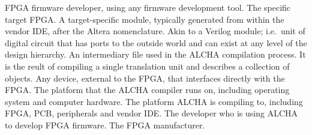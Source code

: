 {       {FPGA firmware developer, using any firmware development tool.}
          {The specific target FPGA.}
    {A target-specific module, typically generated from within the vendor IDE, after the Altera nomenclature.}
          {Akin to a Verilog module; i.e.~unit of digital circuit that has ports to the outside world and can exist at any level of the design hierarchy.}
     {An intermediary file used in the ALCHA compilation process.  It is the reult of compiling a single translation unit and describes a collection of objects.}
      {Any device, external to the FPGA, that interfaces directly with the FPGA.}
        {The platform that the ALCHA compiler runs on, including operating system and computer hardware.}
          {The platform ALCHA is compiling to, including FPGA, PCB, peripherals and vendor IDE.}
            {The developer who is using ALCHA to develop FPGA firmware.}
          {The FPGA manufacturer.}

}
